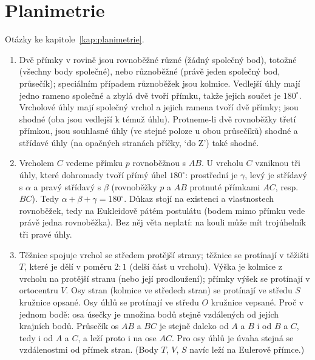 \section{Planimetrie}

Otázky ke kapitole~\ref{kap:planimetrie}.

\begin{enumerate}[label=\textbf{\arabic*.}, leftmargin=*, itemsep=0.8em]
  \item {}
  Dvě přímky v rovině jsou rovnoběžné různé (žádný společný bod), totožné (všechny body společné), nebo různoběžné (právě jeden společný bod, průsečík); speciálním případem různoběžek jsou kolmice. Vedlejší úhly mají jedno rameno společné a zbylá dvě tvoří přímku, takže jejich součet je $180^\circ$. Vrcholové úhly mají společný vrchol a jejich ramena tvoří dvě přímky; jsou shodné (oba jsou vedlejší k témuž úhlu). Protneme-li dvě rovnoběžky třetí přímkou, jsou souhlasné úhly (ve stejné poloze u obou průsečíků) shodné a střídavé úhly (na opačných stranách příčky, `do Z') také shodné. 

  \item {}
  Vrcholem $C$ vedeme přímku $p$ rovnoběžnou s $AB$. U vrcholu $C$ vzniknou tři úhly, které dohromady tvoří přímý úhel $180^\circ$: prostřední je $\gamma$, levý je střídavý s $\alpha$ a pravý střídavý s $\beta$ (rovnoběžky $p$ a $AB$ protnuté přímkami $AC$, resp. $BC$). Tedy $\alpha + \beta + \gamma = 180^\circ$. Důkaz stojí na existenci a vlastnostech rovnoběžek, tedy na Eukleidově pátém postulátu (bodem mimo přímku vede právě jedna rovnoběžka). Bez něj věta neplatí: na kouli může mít trojúhelník tři pravé úhly. 

  \item {}
  Těžnice spojuje vrchol se středem protější strany; těžnice se protínají v těžišti $T$, které je dělí v poměru $2:1$ (delší část u vrcholu). Výška je kolmice z vrcholu na protější stranu (nebo její prodloužení); přímky výšek se protínají v ortocentru $V$. Osy stran (kolmice ve středech stran) se protínají ve středu $S$ kružnice opsané. Osy úhlů se protínají ve středu $O$ kružnice vepsané. Proč v jednom bodě: osa úsečky je množina bodů stejně vzdálených od jejích krajních bodů. Průsečík os $AB$ a $BC$ je stejně daleko od $A$ a $B$ i od $B$ a $C$, tedy i od $A$ a $C$, a leží proto i na ose $AC$. Pro osy úhlů je úvaha stejná se vzdálenostmi od přímek stran. (Body $T$, $V$, $S$ navíc leží na Eulerově přímce.) 


\end{enumerate}
